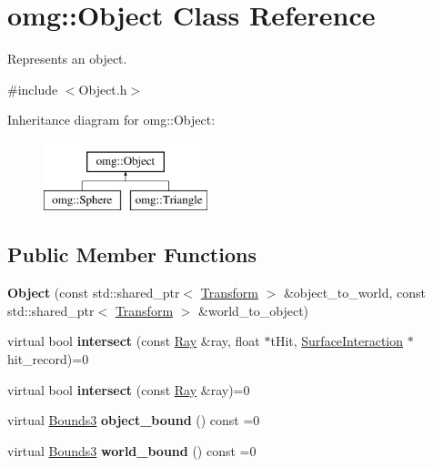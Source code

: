 \hypertarget{classomg_1_1_object}{}\section{omg\+::Object Class Reference}
\label{classomg_1_1_object}


Represents an object.  




{\ttfamily \#include $<$Object.\+h$>$}

Inheritance diagram for omg\+::Object\+:\begin{figure}[H]
\begin{center}
\leavevmode
\includegraphics[height=2.000000cm]{classomg_1_1_object}
\end{center}
\end{figure}
\subsection*{Public Member Functions}
\begin{DoxyCompactItemize}
\item 
\mbox{\label{classomg_1_1_object_a9e104624609a4e028e63cef64374979c}} 
{\bfseries Object} (const std\+::shared\+\_\+ptr$<$ \mbox{\hyperlink{classomg_1_1_transform}{Transform}} $>$ \&object\+\_\+to\+\_\+world, const std\+::shared\+\_\+ptr$<$ \mbox{\hyperlink{classomg_1_1_transform}{Transform}} $>$ \&world\+\_\+to\+\_\+object)
\item 
\mbox{\label{classomg_1_1_object_a56354058785d04afff686ae41e144970}} 
virtual bool {\bfseries intersect} (const \mbox{\hyperlink{classomg_1_1_ray}{Ray}} \&ray, float $\ast$t\+Hit, \mbox{\hyperlink{classomg_1_1_surface_interaction}{Surface\+Interaction}} $\ast$hit\+\_\+record)=0
\item 
\mbox{\label{classomg_1_1_object_a6bea9275afdd17c67de345043bc0d3fc}} 
virtual bool {\bfseries intersect} (const \mbox{\hyperlink{classomg_1_1_ray}{Ray}} \&ray)=0
\item 
\mbox{\label{classomg_1_1_object_a72b5a834655ca22225b822364969c452}} 
virtual \mbox{\hyperlink{classomg_1_1_bounds3}{Bounds3}} {\bfseries object\+\_\+bound} () const =0
\item 
\mbox{\label{classomg_1_1_object_a571b05c10d7fb654449d68dda18b65e2}} 
virtual \mbox{\hyperlink{classomg_1_1_bounds3}{Bounds3}} {\bfseries world\+\_\+bound} () const =0
\end{DoxyCompactItemize}

